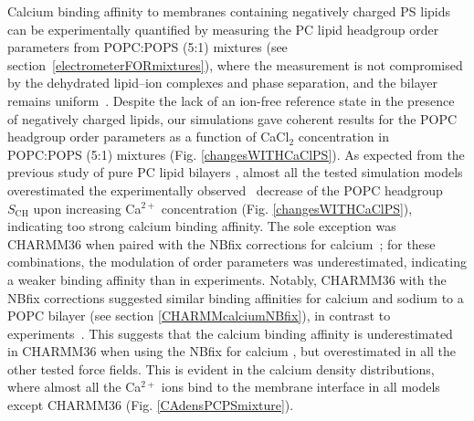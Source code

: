 \documentclass[journal=jpcbfk,manuscript=article]{achemso}
\begin{document}
Calcium binding affinity to membranes containing negatively charged PS lipids can be
experimentally quantified by measuring the PC lipid headgroup order parameters
from POPC:POPS (5:1) mixtures (see section~\ref{electrometerFORmixtures}),
where the measurement is not compromised by the dehydrated lipid--ion complexes and phase separation, and the bilayer remains uniform~\cite{feigenson86,mattai89,roux90,roux91}.
Despite the lack of an ion-free reference state
in the presence of negatively charged lipids, our simulations gave
coherent results for the POPC headgroup order parameters as a function of
CaCl$_2$ concentration in POPC:POPS (5:1) mixtures (Fig. \ref{changesWITHCaClPS}).
As expected from the previous study of pure PC lipid
bilayers \cite{catte16}, almost all the tested simulation models overestimated the
experimentally observed~\cite{roux90} decrease of the POPC headgroup $S_\mathrm{CH}$ upon increasing Ca$^{2+}$ concentration (Fig. \ref{changesWITHCaClPS}),
indicating too strong calcium binding affinity.
The sole exception was CHARMM36 when paired with the NBfix
corrections for calcium~\cite{kim16,han2018graph}; for these combinations, the modulation of order parameters was underestimated, 
indicating a weaker binding affinity than in experiments.
Notably, CHARMM36 with the NBfix corrections \cite{venable13,kim16} suggested similar binding affinities for
calcium and sodium to a POPC bilayer (see section \ref{CHARMMcalciumNBfix}), in contrast to experiments~\cite{cevc90,akutsu81,altenbach84}. This suggests that the calcium binding affinity
is underestimated in CHARMM36 when using the NBfix for calcium \cite{kim16,han2018graph}, but overestimated 
in all the other tested force fields. This is evident in the calcium density distributions, where almost all the Ca$^{2+}$ ions bind to the membrane interface in all models except CHARMM36 (Fig. \ref{CAdensPCPSmixture}).
\end{document}
